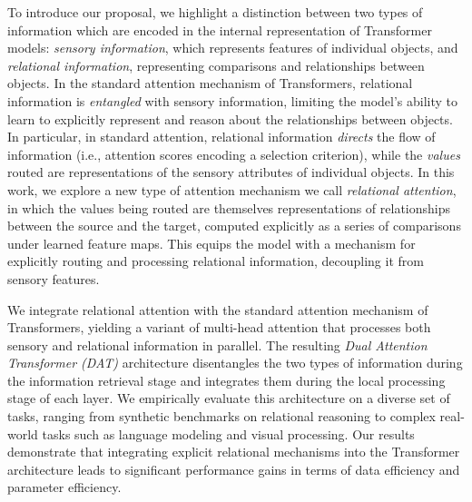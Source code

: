 To introduce our proposal, we highlight a distinction between two types of information which are encoded in the internal representation of Transformer models: \textit{sensory information}, which represents features of individual objects, and \textit{relational information}, representing comparisons and relationships between objects. In the standard attention mechanism of Transformers, relational information is \textit{entangled} with sensory information, limiting the model's ability to learn to explicitly represent and reason about the relationships between objects. In particular, in standard attention, relational information \textit{directs} the flow of information (i.e., attention scores encoding a selection criterion), while the \textit{values} routed are representations of the sensory attributes of individual objects. In this work, we explore a new type of attention mechanism we call \textit{relational attention}, in which the values being routed are themselves representations of relationships between the source and the target, computed explicitly as a series of comparisons under learned feature maps. This equips the model with a mechanism for explicitly routing and processing relational information, decoupling it from sensory features.

We integrate relational attention with the standard attention mechanism of Transformers, yielding a variant of multi-head attention that processes both sensory and relational information in parallel. The resulting \textit{Dual Attention Transformer (DAT)} architecture disentangles the two types of information during the information retrieval stage and integrates them during the local processing stage of each layer. We empirically evaluate this architecture on a diverse set of tasks, ranging from synthetic benchmarks on relational reasoning to complex real-world tasks such as language modeling and visual processing. Our results demonstrate that integrating explicit relational mechanisms into the Transformer architecture leads to significant performance gains in terms of data efficiency and parameter efficiency.

